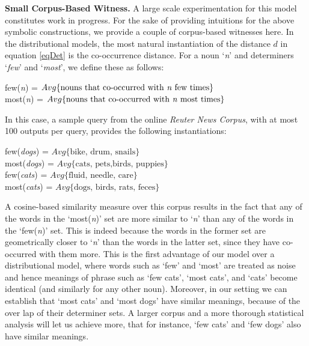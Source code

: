 \noindent
{\bf Small Corpus-Based Witness.} 
A large scale experimentation  for this model constitutes work in progress.  For the sake of providing  intuitions for the above symbolic constructions, we provide a couple of corpus-based witnesses here. In the distributional models, the most natural instantiation of the distance $d$  in equation \ref{eqDet} is the  co-occurrence distance. For a noun `\emph{n}' and determiners `\emph{few}' and `\emph{most}', we  define these as follows:
\begin{center}
few(\emph{n}) = $Avg\{\mbox{nouns that co-occurred with  \emph{n} few times}\}$\\
most(\emph{n}) = $Avg\{\mbox{nouns that co-occurred with \emph{n} most times}\}$
\end{center}
In this case, a sample query from the online  \emph{Reuter News Corpus}, with at most 100 outputs per query,  provides the following instantiations:
\begin{center}
few(\emph{dogs}) = $Avg\{\mbox{bike, drum, snails}\}$\\
most(\emph{dogs}) = $Avg\{\mbox{cats, pets,birds, puppies}\}$\\
few(\emph{cats}) = $Avg\{\mbox{fluid, needle, care}\}$\\
most(\emph{cats}) = $Avg\{\mbox{dogs, birds, rats, feces}\}$\\
\end{center}
A cosine-based similarity measure over this corpus results in the fact that any of the words in the `most(\emph{n})' set are   more similar to `\emph{n}' than any of  the  words in the `few(\emph{n})' set. This is indeed because  the words in the former set are geometrically closer to `\emph{n}' than the words in the latter set, since they have co-occurred with them more.  This is the first advantage of our model over  a distributional model, where words such as `few' and `most' are treated as  {noise} and hence meanings of phrase such as `few cats', `most cats', and `cats'  become  identical (and similarly for any other noun). Moreover, in our setting we can establish that `most cats' and `most dogs' have similar meanings, because of the over lap of their determiner sets. A larger corpus and a more thorough statistical analysis  will let us achieve more,  that for instance,   `few cats' and `few dogs' also have similar meanings. 

